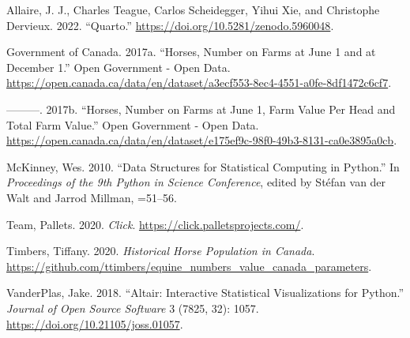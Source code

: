 \documentclass[
  letterpaper,
  DIV=11,
  numbers=noendperiod]{scrartcl}
\newlength{\cslhangindent}
\newlength{\cslentryspacingunit} %
\newenvironment{CSLReferences}[2] %
 {%
  \setlength{\parindent}{0pt}
  \ifodd #1
  \let\oldpar\par
  \def\par{\hangindent=\cslhangindent\oldpar}
  \fi
  \setlength{\parskip}{#2\cslentryspacingunit}
 }%
 {}
\begin{document}
\hypertarget{refs}{}
\begin{CSLReferences}{1}{0}
\leavevmode{}%
Allaire, J. J., Charles Teague, Carlos Scheidegger, Yihui Xie, and
Christophe Dervieux. 2022. {``{Quarto}.''}
\url{https://doi.org/10.5281/zenodo.5960048}.

\leavevmode{}%
Government of Canada. 2017a. {``Horses, Number on Farms at June 1 and at
December 1.''} Open Government - Open Data.
\url{https://open.canada.ca/data/en/dataset/a3ecf553-8ec4-4551-a0fe-8df1472c6cf7}.

\leavevmode{}%
---------. 2017b. {``Horses, Number on Farms at June 1, Farm Value Per
Head and Total Farm Value.''} Open Government - Open Data.
\url{https://open.canada.ca/data/en/dataset/e175ef9c-98f0-49b3-8131-ca0e3895a0cb}.

\leavevmode{}%
McKinney, Wes. 2010. {``Data Structures for Statistical Computing in
Python.''} In \emph{Proceedings of the 9th Python in Science
Conference}, edited by Stéfan van der Walt and Jarrod Millman, =51--56.

\leavevmode{}%
Team, Pallets. 2020. \emph{Click}.
\url{https://click.palletsprojects.com/}.

\leavevmode{}%
Timbers, Tiffany. 2020. \emph{Historical Horse Population in Canada}.
\url{https://github.com/ttimbers/equine_numbers_value_canada_parameters}.

\leavevmode{}%
VanderPlas, Jake. 2018. {``Altair: Interactive Statistical
Visualizations for Python.''} \emph{Journal of Open Source Software} 3
(7825, 32): 1057. \url{https://doi.org/10.21105/joss.01057}.

\end{CSLReferences}
\end{document}
